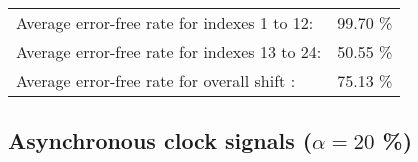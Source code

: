 \begin{table}[h]
\begin{center}
\begin{tabular}{|c|c|c|c|c|}
\end{tabular}


\flushleft
\begin{tabular}{l l}
Average error-free rate for indexes  1 to 12: & 99.70 \% \\
Average error-free rate for indexes 13 to 24: & 50.55 \% \\
Average error-free rate for overall shift   : & 75.13 \% \\

\end{tabular}


\end{center}
\end{table}

\pagebreak
\subsection{Asynchronous clock signals ($\alpha=20$ \%)}

